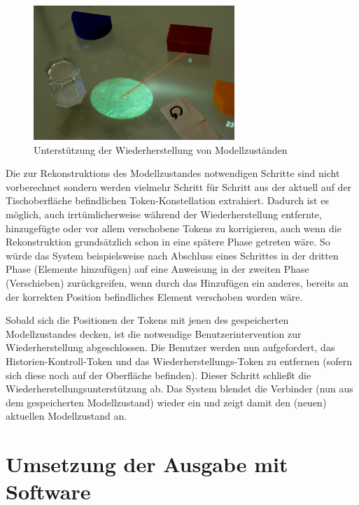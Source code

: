 \begin{figure}[htbp]
	\centering
		\includegraphics[height=2in]{img/SystemNeu/WiederherstellungTisch.jpg}
	\caption{Unterstützung der Wiederherstellung von Modellzuständen}
	\label{fig:img_SystemNeu_WiederherstellungTisch}
\end{figure}

Die zur Rekonstruktions des Modellzustandes notwendigen Schritte sind nicht vorberechnet sondern werden vielmehr Schritt für Schritt aus der aktuell auf der Tischoberfläche befindlichen Token-Konstellation extrahiert. Dadurch ist es möglich, auch irrtümlicherweise während der Wiederherstellung entfernte, hinzugefügte oder vor allem verschobene Tokens zu korrigieren, auch wenn die Rekonstruktion grundsätzlich schon in eine spätere Phase getreten wäre. So würde das System beispielsweise nach Abschluss eines Schrittes in der dritten Phase (Elemente hinzufügen) auf eine Anweisung in der zweiten Phase (Verschieben) zurückgreifen, wenn durch das Hinzufügen ein anderes, bereits an der korrekten Position befindliches Element verschoben worden wäre.

Sobald sich die Positionen der Tokens mit jenen des gespeicherten Modellzustandes decken, ist die notwendige Benutzerintervention zur Wiederherstellung abgeschlossen. Die Benutzer werden nun aufgefordert, das Historien-Kontroll-Token und das Wiederherstellungs-Token zu entfernen (sofern sich diese noch auf der Oberfläche befinden). Dieser Schritt schließt die Wiederherstellungsunterstützung ab. Das System blendet die Verbinder (nun aus dem gespeicherten Modellzustand) wieder ein und zeigt damit den (neuen) aktuellen Modellzustand an. 



\section{Umsetzung der Ausgabe mit Software} %
\label{sec:umsetzung_der_ausgabe_mit_software}

